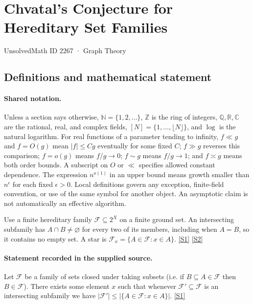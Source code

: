 \documentclass[11pt,a4paper]{article}
\newcommand{\N}{\mathbb{N}}
\newcommand{\Z}{\mathbb{Z}}
\newcommand{\Q}{\mathbb{Q}}
\newcommand{\R}{\mathbb{R}}
\newcommand{\C}{\mathbb{C}}
\newcommand{\sref}[2]{\hyperlink{source:#1:#2}{[S#2]}}
\begin{document}

\setcounter{section}{2266}

\section{Chvatal's Conjecture for Hereditary Set Families}\label{2267}

{\small\sffamily UnsolvedMath ID 2267 · Graph Theory}

\subsection{Definitions and mathematical statement}

\paragraph{Shared notation.}Unless a section says otherwise, $\N=\{1,2,\ldots\}$,
$\Z$ is the ring of integers, $\Q,\R,\C$ are the rational, real, and complex
fields, $[N]=\{1,\ldots,\lfloor N\rfloor\}$, and $\log$ is the natural
logarithm. For real functions of a parameter tending to infinity,
$f\ll g$ and $f=O(g)$ mean $|f|\leq Cg$ eventually for some fixed $C$;
$f\gg g$ reverses this comparison; $f=o(g)$ means $f/g\to0$;
$f\sim g$ means $f/g\to1$; and $f\asymp g$ means both order bounds.
A subscript on $O$ or $\ll$ specifies allowed constant dependence.
The expression $n^{o(1)}$ in an upper bound means growth smaller than
$n^\epsilon$ for each fixed $\epsilon>0$. Local definitions govern any
exception, finite-field convention, or use of the same symbol for another
object. An asymptotic claim is not automatically an effective algorithm.



Use a finite hereditary family $\mathcal F\subseteq2^X$ on a finite ground set. An intersecting subfamily has $A\cap B\ne\varnothing$ for every two of its members, including when $A=B$, so it contains no empty set. A star is $\mathcal F_x=\{A\in\mathcal F:x\in A\}$. \sref{2267}{1} \sref{2267}{2}

\paragraph{Statement recorded in the supplied source.}
Let $\mathcal{F}$ be a family of sets closed under taking subsets (i.e. if $B\subseteq A\in\mathcal{F}$ then $B\in \mathcal{F}$). There exists some element $x$ such that whenever $\mathcal{F}'\subseteq \mathcal{F}$ is an intersecting subfamily we have $ \lvert \mathcal{F}'\rvert \leq \lvert \{ A\in \mathcal{F} : x\in A\}\rvert. $ \sref{2267}{1}
\end{document}
